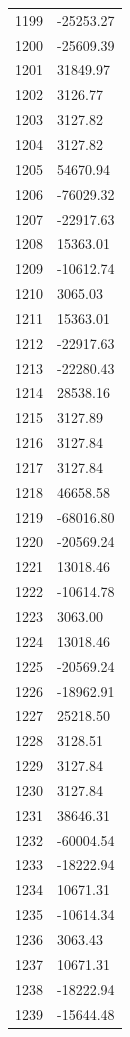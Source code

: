 \documentclass[a4paper,11pt]{article}
\begin{document}
\begin{center}
\begin{longtable}{|R{1.5cm}|R{2.6cm}|}
 1199 &    -25253.27 \\
 1200 &    -25609.39 \\
 1201 &     31849.97 \\
 1202 &      3126.77 \\
 1203 &      3127.82 \\
 1204 &      3127.82 \\
 1205 &     54670.94 \\
 1206 &    -76029.32 \\
 1207 &    -22917.63 \\
 1208 &     15363.01 \\
 1209 &    -10612.74 \\
 1210 &      3065.03 \\
 1211 &     15363.01 \\
 1212 &    -22917.63 \\
 1213 &    -22280.43 \\
 1214 &     28538.16 \\
 1215 &      3127.89 \\
 1216 &      3127.84 \\
 1217 &      3127.84 \\
 1218 &     46658.58 \\
 1219 &    -68016.80 \\
 1220 &    -20569.24 \\
 1221 &     13018.46 \\
 1222 &    -10614.78 \\
 1223 &      3063.00 \\
 1224 &     13018.46 \\
 1225 &    -20569.24 \\
 1226 &    -18962.91 \\
 1227 &     25218.50 \\
 1228 &      3128.51 \\
 1229 &      3127.84 \\
 1230 &      3127.84 \\
 1231 &     38646.31 \\
 1232 &    -60004.54 \\
 1233 &    -18222.94 \\
 1234 &     10671.31 \\
 1235 &    -10614.34 \\
 1236 &      3063.43 \\
 1237 &     10671.31 \\
 1238 &    -18222.94 \\
 1239 &    -15644.48 \\

\end{longtable}
\end{center}
\end{document}
